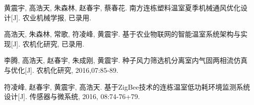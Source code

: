 
\begin{publications}{99}
    \item\textsc{黄震宇, 高浩天, 朱森林, 赵春宇, 蔡春花}. {南方连栋塑料温室夏季机械通风优化设计}[J]. 农业机械学报, 已录用.
    \item\textsc{高浩天, 朱森林, 常歌, 符凌峰, 黄震宇}. {基于农业物联网的智能温室系统架构与实现}[J]. 农机化研究, 已录用.
    \item\textsc{李腾, 高浩天, 赵春宇, 朱成刚, 黄震宇}. {种子风力筛选机分离室内气固两相流仿真与优化}[J]. 农机化研究, 2016,07:85-89.
    \item\textsc{符凌峰, 赵春宇, 黄震宇, 高浩天}. {基于ZigBee技术的连栋温室低功耗环境监测系统设计}[J]. 传感器与微系统, 2016, 08:74-76+79.
\end{publications}
